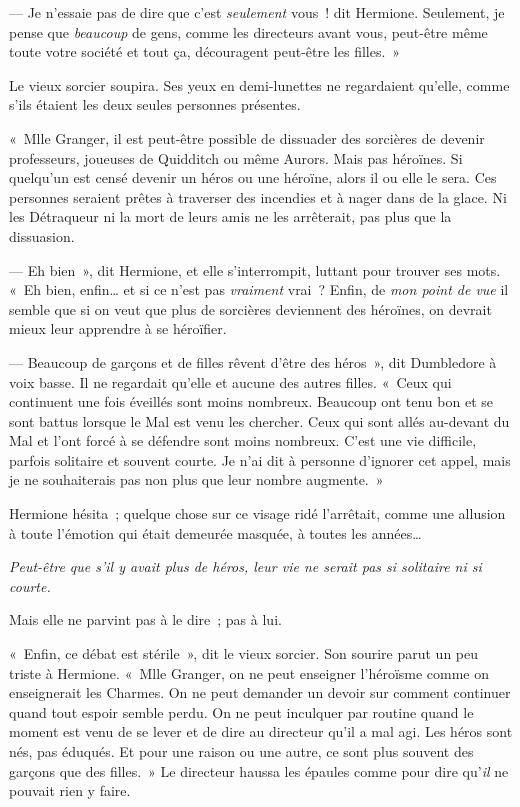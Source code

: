--- Je n'essaie pas de dire que c'est \emph{seulement} vous~! dit Hermione.
Seulement, je pense que \emph{beaucoup} de gens, comme les directeurs avant vous, peut-être même toute votre société et tout ça, découragent peut-être les filles.~»

Le vieux sorcier soupira.
Ses yeux en demi-lunettes ne regardaient qu'elle, comme s'ils étaient les deux seules personnes présentes.

«~Mlle Granger, il est peut-être possible de dissuader des sorcières de devenir professeurs, joueuses de Quidditch ou même Aurors.
Mais pas héroïnes.
Si quelqu'un est censé devenir un héros ou une héroïne, alors il ou elle le sera.
Ces personnes seraient prêtes à traverser des incendies et à nager dans de la glace.
Ni les Détraqueur ni la mort de leurs amis ne les arrêterait, pas plus que la dissuasion.

--- Eh bien~», dit Hermione, et elle s'interrompit, luttant pour trouver ses mots.
«~Eh bien, enfin… et si ce n'est pas \emph{vraiment} vrai~?
Enfin, de \emph{mon point de vue} il semble que si on veut que plus de sorcières deviennent des héroïnes, on devrait mieux leur apprendre à se héroïfier.

--- Beaucoup de garçons et de filles rêvent d'être des héros~», dit Dumbledore à voix basse.
Il ne regardait qu'elle et aucune des autres filles.
«~Ceux qui continuent une fois éveillés sont moins nombreux.
Beaucoup ont tenu bon et se sont battus lorsque le Mal est venu les chercher.
Ceux qui sont allés au-devant du Mal et l'ont forcé à se défendre sont moins nombreux.
C'est une vie difficile, parfois solitaire et souvent courte.
Je n'ai dit à personne d'ignorer cet appel, mais je ne souhaiterais pas non plus que leur nombre augmente.~»

Hermione hésita~; quelque chose sur ce visage ridé l'arrêtait, comme une allusion à toute l'émotion qui était demeurée masquée, à toutes les années…

\emph{Peut-être que s'il y avait plus de héros, leur vie ne serait pas si solitaire ni si courte.}

Mais elle ne parvint pas à le dire~; pas à lui.

«~Enfin, ce débat est stérile~», dit le vieux sorcier.
Son sourire parut un peu triste à Hermione.
«~Mlle Granger, on ne peut enseigner l'héroïsme comme on enseignerait les Charmes.
On ne peut demander un devoir sur comment continuer quand tout espoir semble perdu.
On ne peut inculquer par routine quand le moment est venu de se lever et de dire au directeur qu'il a mal agi.
Les héros sont nés, pas éduqués.
Et pour une raison ou une autre, ce sont plus souvent des garçons que des filles.~»
Le directeur haussa les épaules comme pour dire qu'\emph{il} ne pouvait rien y faire.

